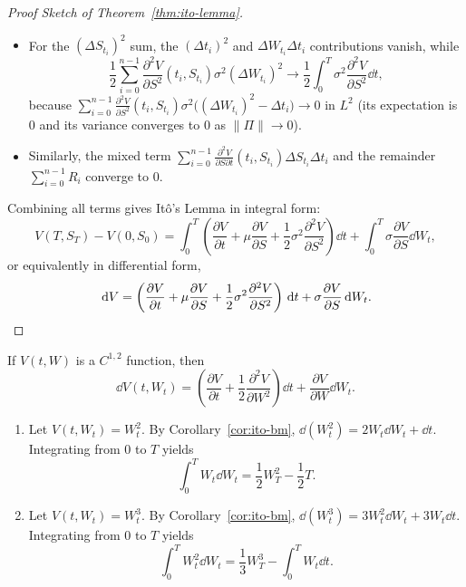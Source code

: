 \begin{proof}[Proof Sketch of Theorem~\ref{thm:ito-lemma}]
\begin{itemize}
    \item For the $(\Delta S_{t_i})^2$ sum, the $(\Delta t_i)^2$ and $\Delta W_{t_i}\Delta t_i$ contributions vanish, while
    \[
    \frac{1}{2}\sum_{i=0}^{n-1} \frac{\partial^2 V}{\partial S^2}(t_i, S_{t_i})\sigma^2 (\Delta W_{t_i})^2 \to \frac{1}{2}\int_0^T \sigma^2 \frac{\partial^2 V}{\partial S^2}\dd t,
    \]
    because $\sum_{i=0}^{n-1} \frac{\partial^2 V}{\partial S^2}(t_i, S_{t_i})\sigma^2 \big((\Delta W_{t_i})^2 - \Delta t_i\big) \to 0$ in $L^2$ (its expectation is $0$ and its variance converges to $0$ as $\|\Pi\| \to 0$).
    \item Similarly, the mixed term $\sum_{i=0}^{n-1} \frac{\partial^2 V}{\partial S \partial t}(t_i, S_{t_i})\Delta S_{t_i}\Delta t_i$ and the remainder $\sum_{i=0}^{n-1} R_i$ converge to $0$.
\end{itemize}
Combining all terms gives It\^o's Lemma in integral form:
\[
V(T, S_T) - V(0, S_0) = \int_0^T \left(\frac{\partial V}{\partial t} + \mu \frac{\partial V}{\partial S} + \frac{1}{2}\sigma^2 \frac{\partial^2 V}{\partial S^2}\right)\dd t + \int_0^T \sigma \frac{\partial V}{\partial S}\dd W_t,
\]
or equivalently in differential form,
\[
\,\mathrm{d} V = \left(\frac{\partial V}{\partial t} + \mu \frac{\partial V}{\partial S} + \frac{1}{2}\sigma^2 \frac{\partial^2 V}{\partial S^2}\right)\,\mathrm{d} t + \sigma \frac{\partial V}{\partial S}\,\mathrm{d} W_t. \qedhere
\]
\end{proof}

\begin{corollary}
\label{cor:ito-bm}
If $V(t, W)$ is a $C^{1,2}$ function, then
\[
\dd V(t, W_t) = \left(\frac{\partial V}{\partial t} + \frac{1}{2}\frac{\partial^2 V}{\partial W^2}\right)\dd t + \frac{\partial V}{\partial W}\dd W_t.
\]
\end{corollary}

\begin{example}
\label{ex:ito-powers}
\begin{enumerate}
    \item Let $V(t, W_t) = W_t^2$. By Corollary~\ref{cor:ito-bm}, $\dd(W_t^2) = 2 W_t \dd W_t + \dd t$. Integrating from $0$ to $T$ yields
    \[
    \int_0^T W_t \dd W_t = \frac{1}{2} W_T^2 - \frac{1}{2} T.
    \]
    \item Let $V(t, W_t) = W_t^3$. By Corollary~\ref{cor:ito-bm}, $\dd(W_t^3) = 3 W_t^2 \dd W_t + 3 W_t \dd t$. Integrating from $0$ to $T$ yields
    \[
    \int_0^T W_t^2 \dd W_t = \frac{1}{3} W_T^3 - \int_0^T W_t \dd t.
    \]
\end{enumerate}
\end{example}

